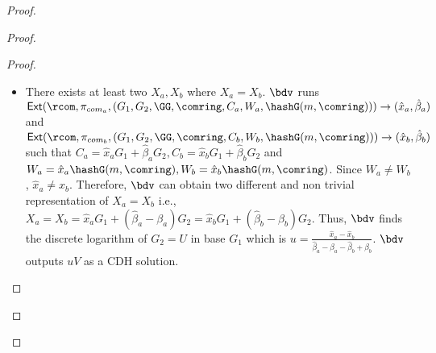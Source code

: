 \begin{proof}
\begin{proof}
\begin{proof}
\begin{itemize}
				
				\item There exists at least two $ X_a,X_b $ where $ X_a = X_b $. $ \bdv $ runs $ \mathsf{Ext}(\rcom,\pi_{com_a},(G_1,G_2, \GG,\comring, C_a,W_a,\hashG(m,\comring))) \rightarrow (\hat{x}_a,\hat{\beta}_a )$ and $ \mathsf{Ext}(\rcom,\pi_{com_b},(G_1,G_2, \GG,\comring, C_b,W_b,\hashG(m,\comring))) \rightarrow (\hat{x}_b,\hat{\beta}_b )$ such that $ C_a = \hat{x}_aG_1 + \hat{\beta}_a G_2, C_b = \hat{x}_bG_1 + \hat{\beta}_b G_2 $ and $ W_a = \hat{x}_a \hashG(m,\comring), W_b = \hat{x}_b \hashG(m,\comring) $. Since $ W_a \neq W_b $, $ \hat{x}_a \neq \hat{x}_b $.  Therefore, $ \bdv $ can obtain  two different and non trivial representation of $ X_a = X_b $ i.e., $ X_a = X_b = \hat{x}_aG_1 + (\hat{\beta}_a - \beta_a) G_2 = \hat{x}_bG_1 + (\hat{\beta}_b - \beta_b) G_2  $. Thus, $ \bdv $ finds the discrete logarithm of $ G_2 = U $ in base $ G_1 $ which is $ u = \frac{\hat{x}_a - \hat{x}_b}{\hat{\beta}_a -\beta_a -\hat{\beta}_b + \beta_b} $. $ \bdv $ outputs $ uV $ as a CDH solution.
			\end{itemize}
			
			
			
			
			
			
			
			
			
			
			
			
			

\end{proof}
\end{proof}
\end{proof}
